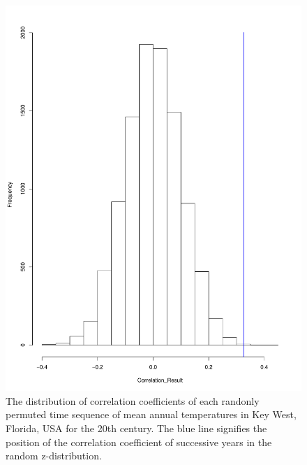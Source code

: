 \documentclass[12pt]{article}
\begin{document}
  \begin{figure}[ht]
  \includegraphics[width=1\textwidth]{../Data/TAutoCorr_hist.pdf}
  \caption{The distribution of correlation coefficients of each randonly permuted time sequence of mean annual temperatures in Key West, Florida, USA for the 20th century. The blue line signifies the position of the correlation coefficient of successive years in the random z-distribution.}
  \end{figure}
\end{document}
